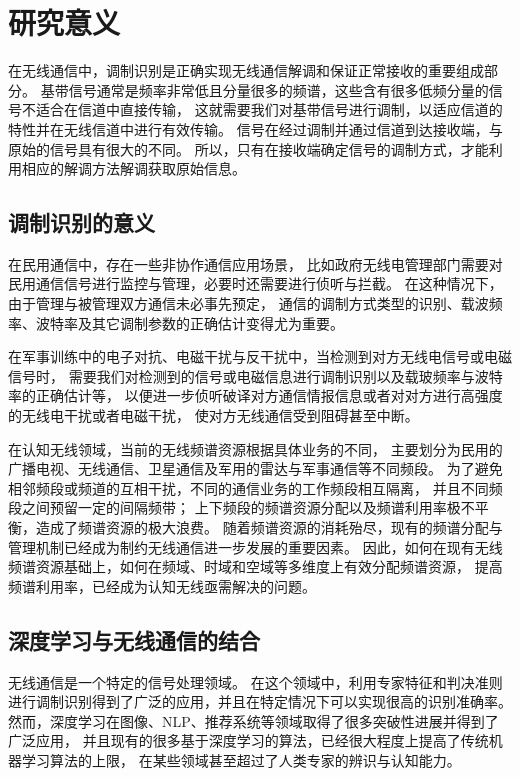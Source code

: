 \section{研究意义}

在无线通信中，调制识别是正确实现无线通信解调和保证正常接收的重要组成部分。
基带信号通常是频率非常低且分量很多的频谱，这些含有很多低频分量的信号不适合在信道中直接传输，
这就需要我们对基带信号进行调制，以适应信道的特性并在无线信道中进行有效传输。
信号在经过调制并通过信道到达接收端，与原始的信号具有很大的不同。
所以，只有在接收端确定信号的调制方式，才能利用相应的解调方法解调获取原始信息。\par

\subsection{调制识别的意义}
在民用通信中，存在一些非协作通信应用场景，
比如政府无线电管理部门需要对民用通信信号进行监控与管理，必要时还需要进行侦听与拦截。
在这种情况下，由于管理与被管理双方通信未必事先预定，
通信的调制方式类型的识别、载波频率、波特率及其它调制参数的正确估计变得尤为重要。\par

在军事训练中的电子对抗、电磁干扰与反干扰中，当检测到对方无线电信号或电磁信号时，
需要我们对检测到的信号或电磁信息进行调制识别以及载玻频率与波特率的正确估计等，
以便进一步侦听破译对方通信情报信息或者对对方进行高强度的无线电干扰或者电磁干扰，
使对方无线通信受到阻碍甚至中断。\par

在认知无线领域，当前的无线频谱资源根据具体业务的不同，
主要划分为民用的广播电视、无线通信、卫星通信及军用的雷达与军事通信等不同频段。
为了避免相邻频段或频道的互相干扰，不同的通信业务的工作频段相互隔离，
并且不同频段之间预留一定的间隔频带；
上下频段的频谱资源分配以及频谱利用率极不平衡，造成了频谱资源的极大浪费。
随着频谱资源的消耗殆尽，现有的频谱分配与管理机制已经成为制约无线通信进一步发展的重要因素。
因此，如何在现有无线频谱资源基础上，如何在频域、时域和空域等多维度上有效分配频谱资源，
提高频谱利用率，已经成为认知无线亟需解决的问题。\par

\subsection{深度学习与无线通信的结合}

无线通信是一个特定的信号处理领域。 
在这个领域中，利用专家特征和判决准则进行调制识别得到了广泛的应用，并且在特定情况下可以实现很高的识别准确率。
然而，深度学习在图像、NLP、推荐系统等领域取得了很多突破性进展并得到了广泛应用，
并且现有的很多基于深度学习的算法，已经很大程度上提高了传统机器学习算法的上限，
在某些领域甚至超过了人类专家的辨识与认知能力。\par

